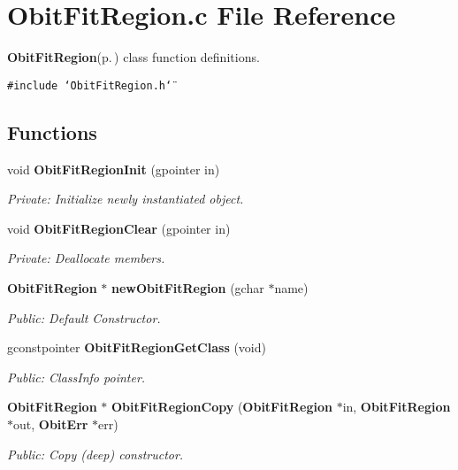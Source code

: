\section{Obit\-Fit\-Region.c File Reference}
\label{ObitFitRegion_8c}
{\bf Obit\-Fit\-Region}{\rm (p.\,\pageref{structObitFitRegion})} class function definitions. 

{\tt \#include \char`\"{}Obit\-Fit\-Region.h\char`\"{}}\par
\subsection*{Functions}
\begin{CompactItemize}
\item 
void {\bf Obit\-Fit\-Region\-Init} (gpointer in)
\begin{CompactList}\small\item\em Private: Initialize newly instantiated object. \item\end{CompactList}\item 
void {\bf Obit\-Fit\-Region\-Clear} (gpointer in)
\begin{CompactList}\small\item\em Private: Deallocate members. \item\end{CompactList}\item 
{\bf Obit\-Fit\-Region} $\ast$ {\bf new\-Obit\-Fit\-Region} (gchar $\ast$name)
\begin{CompactList}\small\item\em Public: Default Constructor. \item\end{CompactList}\item 
gconstpointer {\bf Obit\-Fit\-Region\-Get\-Class} (void)
\begin{CompactList}\small\item\em Public: Class\-Info pointer. \item\end{CompactList}\item 
{\bf Obit\-Fit\-Region} $\ast$ {\bf Obit\-Fit\-Region\-Copy} ({\bf Obit\-Fit\-Region} $\ast$in, {\bf Obit\-Fit\-Region} $\ast$out, {\bf Obit\-Err} $\ast$err)
\begin{CompactList}\small\item\em Public: Copy (deep) constructor. \item\end{CompactList}\item 

\end{CompactItemize}
